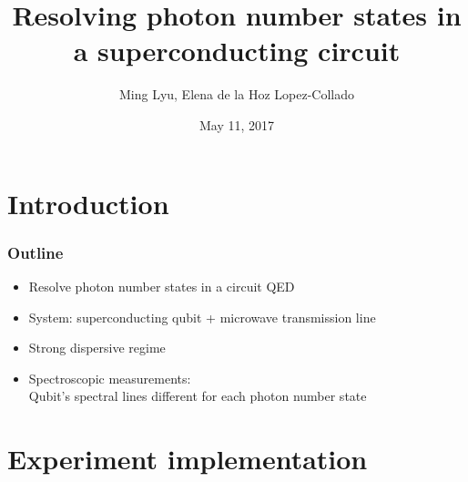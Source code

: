 \documentclass[xcolor=dvipsnames,hyperref={CJKbookmarks=true}]{beamer}
\title[Nature 445, 515-518]{Resolving photon number states in a superconducting circuit}
\author[Ming, Elena]{Ming Lyu, Elena de la Hoz Lopez-Collado}
\institute[Princeton]{Final projects for ELE456 at Princeton}
\date{May 11, 2017}
\begin{document}
\begin{frame}
\titlepage
\end{frame}
\begin{frame}
    \tableofcontents
\end{frame}

\section{Introduction} 
    


\begin{frame}
\frametitle{Outline}
\begin{itemize}
\item Resolve photon number states in a circuit QED
\vspace{0.3cm}
\item System: superconducting qubit +  microwave transmission line
\vspace{0.3cm}
\item Strong dispersive regime
\vspace{0.3cm}
\item Spectroscopic measurements: \\
Qubit's spectral lines different for each photon number state
\end{itemize}
\end{frame}

\section{Experiment implementation}
\end{document}
